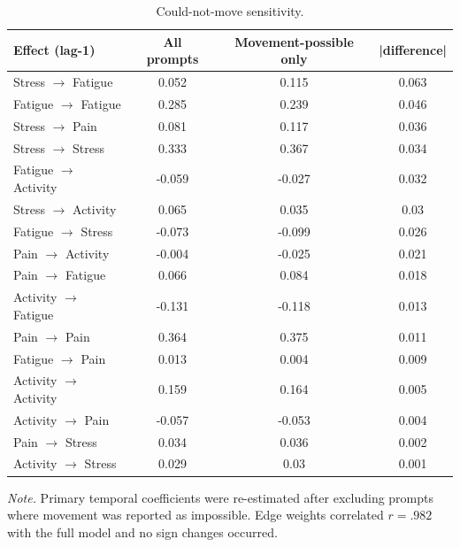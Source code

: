 \begin{table}[H]
\raggedright
\caption{Could-not-move sensitivity.}
\label{tab:sup-cantmove}
\footnotesize
\begingroup
\setlength{\tabcolsep}{4pt}
\renewcommand{\arraystretch}{1.08}
\noindent
\begin{tabular*}{\textwidth}{@{\extracolsep{\fill}}lccc@{}}
\toprule
Effect (lag-1) & All prompts & Movement-possible only & |difference| \\
\midrule
Stress $\rightarrow$ Fatigue & 0.052 & 0.115 & 0.063 \\
Fatigue $\rightarrow$ Fatigue & 0.285 & 0.239 & 0.046 \\
Stress $\rightarrow$ Pain & 0.081 & 0.117 & 0.036 \\
Stress $\rightarrow$ Stress & 0.333 & 0.367 & 0.034 \\
Fatigue $\rightarrow$ Activity & -0.059 & -0.027 & 0.032 \\
Stress $\rightarrow$ Activity & 0.065 & 0.035 & 0.03 \\
Fatigue $\rightarrow$ Stress & -0.073 & -0.099 & 0.026 \\
Pain $\rightarrow$ Activity & -0.004 & -0.025 & 0.021 \\
Pain $\rightarrow$ Fatigue & 0.066 & 0.084 & 0.018 \\
Activity $\rightarrow$ Fatigue & -0.131 & -0.118 & 0.013 \\
Pain $\rightarrow$ Pain & 0.364 & 0.375 & 0.011 \\
Fatigue $\rightarrow$ Pain & 0.013 & 0.004 & 0.009 \\
Activity $\rightarrow$ Activity & 0.159 & 0.164 & 0.005 \\
Activity $\rightarrow$ Pain & -0.057 & -0.053 & 0.004 \\
Pain $\rightarrow$ Stress & 0.034 & 0.036 & 0.002 \\
Activity $\rightarrow$ Stress & 0.029 & 0.03 & 0.001 \\
\bottomrule
\end{tabular*}
\par\vspace{3pt}\noindent\parbox{\textwidth}{\footnotesize\textit{Note.} Primary temporal coefficients were re-estimated after excluding prompts where movement was reported as impossible. Edge weights correlated $r=.982$ with the full model and no sign changes occurred.}
\endgroup
\end{table}
